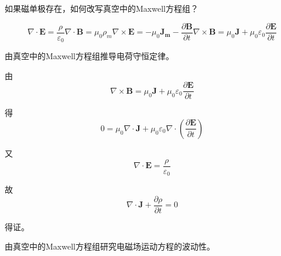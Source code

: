 \documentclass{template}
\begin{document}
\begin{problem}
    如果磁单极存在，如何改写真空中的Maxwell方程组？
\end{problem}
\begin{solution}
    \begin{subequations}
    \begin{equation}
        \nabla\cdot\mathbf{E}=\frac{\rho}{\varepsilon_0}
    \end{equation}
    \begin{equation}
        \nabla\cdot\mathbf{B}=\mu_0\rho_m
    \end{equation}
    \begin{equation}
        \nabla\times\mathbf{E}=-\mu_0\mathbf{J_m}-\frac{\partial\mathbf{B}}{\partial t}
    \end{equation}
    \begin{equation}
        \nabla\times\mathbf{B}=\mu_0\mathbf{J}+\mu_0\varepsilon_0\frac{\partial\mathbf{E}}{\partial t}
    \end{equation}
    \end{subequations}
\end{solution}
\begin{problem}
    由真空中的Maxwell方程组推导电荷守恒定律。
\end{problem}
\begin{solution}
    由
    \begin{equation}
        \nabla\times\mathbf{B}=\mu_0\mathbf{J}+\mu_0\varepsilon_0\frac{\partial\mathbf{E}}{\partial t}
    \end{equation}
    
    得
    \begin{equation}
        0=\mu_0\nabla\cdot\mathbf{J}+\mu_0\varepsilon_0\nabla\cdot(\frac{\partial\mathbf{E}}{\partial t})
    \end{equation}
    
    又
    \begin{equation}
        \nabla\cdot\mathbf{E}=\frac{\rho}{\varepsilon_0}
    \end{equation}

    故
    \begin{equation}
        \nabla\cdot\mathbf{J}+\frac{\partial \rho}{\partial t}=0
    \end{equation}

    得证。
\end{solution}
\begin{problem}
    由真空中的Maxwell方程组研究电磁场运动方程的波动性。
\end{problem}
\end{document}
